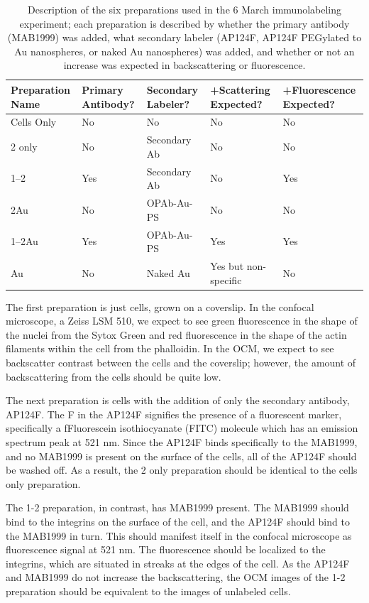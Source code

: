 \begin{table}[hb]
\caption{Description of the six preparations used in the 6 March immunolabeling experiment; each preparation is described by whether the primary antibody (MAB1999) was added, what secondary labeler (AP124F, AP124F PEGylated to Au nanospheres, or naked Au nanospheres) was added, and whether or not an increase was expected in backscattering or fluorescence.}
\begin{minipage}{\linewidth}
\setlength{\tymax}{0.5\linewidth}
\centering
\small
\begin{tabular}{lp{2cm}p{2cm}p{2cm}p{2cm}} \toprule
Preparation Name&Primary Antibody?&Secondary Labeler?&+Scattering Expected?&+Fluorescence Expected?\\
\midrule
Cells Only&No&No&No&No\\
2 only&No&Secondary Ab&No&No\\
1--2&Yes&Secondary Ab&No&Yes\\
2Au&No&OPAb-Au-PS&No&No\\
1--2Au&Yes&OPAb-Au-PS&Yes&Yes\\
Au&No&Naked Au&Yes but non-specific&No\\

\bottomrule

\end{tabular}
\end{minipage}
\label{tab:6MarchPrepTable}
\end{table}

The first preparation is just cells, grown on a coverslip. In the confocal microscope, a Zeiss LSM 510, we expect to see green fluorescence in the shape of the nuclei from the Sytox Green and red fluorescence in the shape of the actin filaments within the cell from the phalloidin. In the OCM, we expect to see backscatter contrast between the cells and the coverslip; however, the amount of backscattering from the cells should be quite low.

The next preparation is cells with the addition of only the secondary antibody, AP124F. The F in the AP124F signifies the presence of a fluorescent marker, specifically a fFluorescein isothiocyanate (FITC) molecule which has an emission spectrum peak at 521 nm. Since the AP124F binds specifically to the MAB1999, and no MAB1999 is present on the surface of the cells, all of the AP124F should be washed off. As a result, the 2 only preparation should be identical to the cells only preparation.

The 1-2 preparation, in contrast, has MAB1999 present. The MAB1999 should bind to the integrins on the surface of the cell, and the AP124F should bind to the MAB1999 in turn. This should manifest itself in the confocal microscope as fluorescence signal at 521 nm. The fluorescence should be localized to the integrins, which are situated in streaks at the edges of the cell. As the AP124F and MAB1999 do not increase the backscattering, the OCM images of the 1-2 preparation should be equivalent to the images of unlabeled cells.

